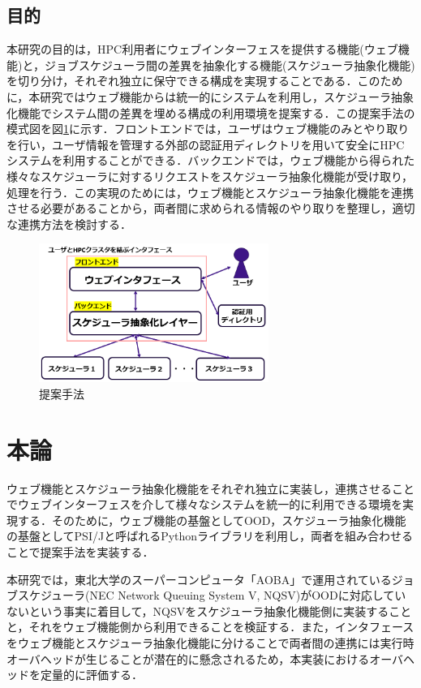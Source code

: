 \documentclass[a4paper,oneside,twocolumn,notitlepage,dvipdfmx]{jsarticle}
\begin{document}
\subsection{目的}
本研究の目的は，HPC利用者にウェブインターフェスを提供する機能(ウェブ機能)と，ジョブスケジューラ間の差異を抽象化する機能(スケジューラ抽象化機能)を切り分け，それぞれ独立に保守できる構成を実現することである．このために，本研究ではウェブ機能からは統一的にシステムを利用し，スケジューラ抽象化機能でシステム間の差異を埋める構成の利用環境を提案する．この提案手法の模式図を図\ref{fig1}に示す．フロントエンドでは，ユーザはウェブ機能のみとやり取りを行い，ユーザ情報を管理する外部の認証用ディレクトリを用いて安全にHPCシステムを利用することができる．バックエンドでは，ウェブ機能から得られた様々なスケジューラに対するリクエストをスケジューラ抽象化機能が受け取り，処理を行う．この実現のためには，ウェブ機能とスケジューラ抽象化機能を連携させる必要があることから，両者間に求められる情報のやり取りを整理し，適切な連携方法を検討する．\par

\begin{figure}[h]
  \centering
  \includegraphics[width=75mm]{./fig/proposed_method.png}
  \caption{提案手法}
  \label{fig1}
\end{figure}

\section{本論}
ウェブ機能とスケジューラ抽象化機能をそれぞれ独立に実装し，連携させることでウェブインターフェスを介して様々なシステムを統一的に利用できる環境を実現する．そのために，ウェブ機能の基盤としてOOD，スケジューラ抽象化機能の基盤としてPSI/J\cite{citation_6}と呼ばれるPythonライブラリを利用し，両者を組み合わせることで提案手法を実装する．\par
本研究では，東北大学のスーパーコンピュータ「AOBA」で運用されているジョブスケジューラ(NEC Network Queuing System V, NQSV)がOODに対応していないという事実に着目して，NQSVをスケジューラ抽象化機能側に実装することと，それをウェブ機能側から利用できることを検証する．また，インタフェースをウェブ機能とスケジューラ抽象化機能に分けることで両者間の連携には実行時オーバヘッドが生じることが潜在的に懸念されるため，本実装におけるオーバヘッドを定量的に評価する．\par
\end{document}
